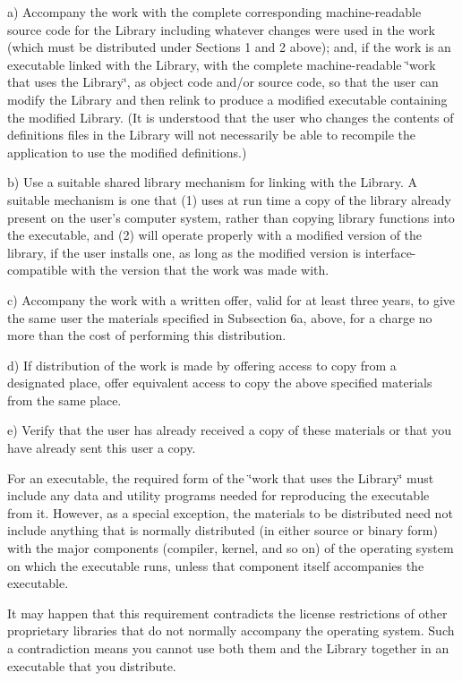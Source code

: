 a) Accompany the work with the complete corresponding machine-readable source code for the Library including whatever changes were used in the work (which must be distributed under Sections 1 and 2 above); and, if the work is an executable linked with the Library, with the complete machine-readable \char`\"{}work that uses the Library\char`\"{}, as object code and/or source code, so that the user can modify the Library and then relink to produce a modified executable containing the modified Library. (It is understood that the user who changes the contents of definitions files in the Library will not necessarily be able to recompile the application to use the modified definitions.)

b) Use a suitable shared library mechanism for linking with the Library. A suitable mechanism is one that (1) uses at run time a copy of the library already present on the user's computer system, rather than copying library functions into the executable, and (2) will operate properly with a modified version of the library, if the user installs one, as long as the modified version is interface-compatible with the version that the work was made with.

c) Accompany the work with a written offer, valid for at least three years, to give the same user the materials specified in Subsection 6a, above, for a charge no more than the cost of performing this distribution.

d) If distribution of the work is made by offering access to copy from a designated place, offer equivalent access to copy the above specified materials from the same place.

e) Verify that the user has already received a copy of these materials or that you have already sent this user a copy.

For an executable, the required form of the \char`\"{}work that uses the Library\char`\"{} must include any data and utility programs needed for reproducing the executable from it. However, as a special exception, the materials to be distributed need not include anything that is normally distributed (in either source or binary form) with the major components (compiler, kernel, and so on) of the operating system on which the executable runs, unless that component itself accompanies the executable.

It may happen that this requirement contradicts the license restrictions of other proprietary libraries that do not normally accompany the operating system. Such a contradiction means you cannot use both them and the Library together in an executable that you distribute.

